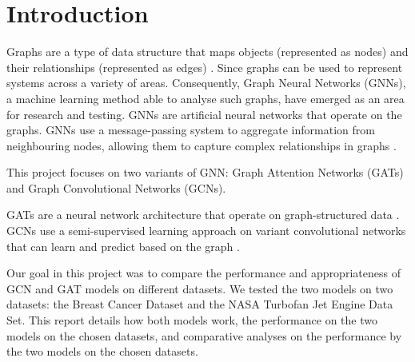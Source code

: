 \documentclass[12pt]{article}
\begin{document}
\pagebreak
\renewcommand{\cftdotsep}{0.5}
\renewcommand{\cftsecleader}{\cftdotfill{\cftdotsep}}
\renewcommand{\contentsname}{Table of Contents}  %
\setlength{\cftbeforesecskip}{10pt}   %
\setlength{\cftbeforesubsecskip}{10pt} %
\setlength{\cftbeforesubsubsecskip}{10pt} %
\renewcommand{\cftsecpresnum}{Chapter~} %
\renewcommand{\cftsecaftersnum}{\quad} 
\setlength{\cftsecnumwidth}{6.1em}   %
\tableofcontents

\pagebreak
{}
\section{Introduction}

Graphs are a type of data structure that maps objects (represented as nodes) and their relationships (represented as edges) \cite{zhouGraphNeuralNetworks2020}. 
Since graphs can be used to represent systems across a variety of areas. Consequently, Graph Neural Networks (GNNs), a machine learning method able to analyse such graphs, have emerged as an area for research and testing. GNNs are artificial neural networks that operate on the graphs. 
GNNs use a message-passing system to aggregate information from neighbouring nodes, allowing them to capture complex relationships in graphs \cite{wuGraphNeuralNetworks2022}.

This project focuses on two variants of GNN:  Graph Attention Networks (GATs) and Graph Convolutional Networks (GCNs).

GATs are a neural network architecture that operate on graph-structured data \cite{nobleWhatGraphNeural2025}.
GCNs use a semi-supervised learning approach on variant convolutional networks that can learn and predict based on the graph \cite{nobleWhatGraphNeural2025}.

Our goal in this project was to compare the performance and appropriateness of GCN and GAT models on different datasets. We tested the two models on two datasets: the Breast Cancer Dataset and the NASA Turbofan Jet Engine Data Set. This report details how both models work, the performance on the two models on the chosen datasets, and comparative analyses on the performance by the two models on the chosen datasets.
\end{document}
